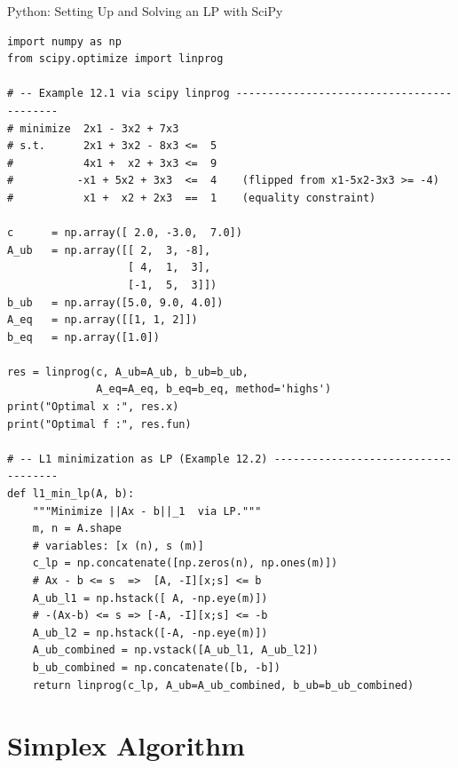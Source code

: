 \documentclass[aspectratio=169,10pt]{beamer}
\begin{document}
\begin{frame}[fragile]{Python: Setting Up and Solving an LP with SciPy}
\begin{lstlisting}
import numpy as np
from scipy.optimize import linprog

# -- Example 12.1 via scipy linprog ------------------------------------------
# minimize  2x1 - 3x2 + 7x3
# s.t.      2x1 + 3x2 - 8x3 <=  5
#           4x1 +  x2 + 3x3 <=  9
#          -x1 + 5x2 + 3x3  <=  4    (flipped from x1-5x2-3x3 >= -4)
#           x1 +  x2 + 2x3  ==  1    (equality constraint)

c      = np.array([ 2.0, -3.0,  7.0])
A_ub   = np.array([[ 2,  3, -8],
                   [ 4,  1,  3],
                   [-1,  5,  3]])
b_ub   = np.array([5.0, 9.0, 4.0])
A_eq   = np.array([[1, 1, 2]])
b_eq   = np.array([1.0])

res = linprog(c, A_ub=A_ub, b_ub=b_ub,
              A_eq=A_eq, b_eq=b_eq, method='highs')
print("Optimal x :", res.x)
print("Optimal f :", res.fun)

# -- L1 minimization as LP (Example 12.2) ------------------------------------
def l1_min_lp(A, b):
    """Minimize ||Ax - b||_1  via LP."""
    m, n = A.shape
    # variables: [x (n), s (m)]
    c_lp = np.concatenate([np.zeros(n), np.ones(m)])
    # Ax - b <= s  =>  [A, -I][x;s] <= b
    A_ub_l1 = np.hstack([ A, -np.eye(m)])
    # -(Ax-b) <= s => [-A, -I][x;s] <= -b
    A_ub_l2 = np.hstack([-A, -np.eye(m)])
    A_ub_combined = np.vstack([A_ub_l1, A_ub_l2])
    b_ub_combined = np.concatenate([b, -b])
    return linprog(c_lp, A_ub=A_ub_combined, b_ub=b_ub_combined)
\end{lstlisting}
\end{frame}

\section{Simplex Algorithm}
\end{document}
